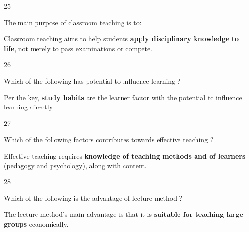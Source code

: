 \begin{question}{25}
{The main purpose of classroom teaching is to:\par}
\begin{explain}
Classroom teaching aims to help students \textbf{apply disciplinary knowledge to life}, not merely to pass examinations or compete.
\end{explain}
\end{question}

\begin{question}{26}
{Which of the following has potential to influence learning ?\par}
\begin{explain}
Per the key, \textbf{study habits} are the learner factor with the potential to influence learning directly.
\end{explain}
\end{question}

\begin{question}{27}
{Which of the following factors contributes towards effective teaching ?\par}
\begin{explain}
Effective teaching requires \textbf{knowledge of teaching methods and of learners} (pedagogy and psychology), along with content.
\end{explain}
\end{question}

\begin{question}{28}
{Which of the following is the advantage of lecture method ?\par}
\begin{explain}
The lecture method's main advantage is that it is \textbf{suitable for teaching large groups} economically.
\end{explain}
\end{question}

